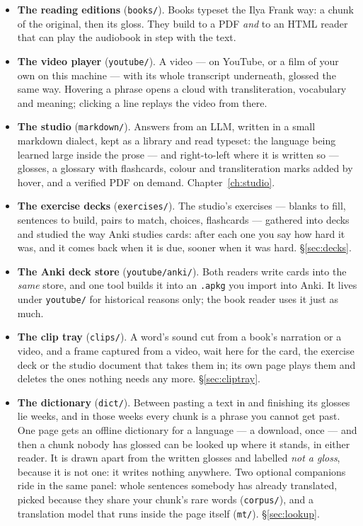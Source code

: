 \documentclass[11pt,oneside]{report}
\newcommand{\file}[1]{\texttt{#1}}
\begin{document}
\begin{itemize}
\item \textbf{The reading editions} (\file{books/}). Books typeset the
  Ilya Frank way: a chunk of the original, then its gloss. They build to a
  PDF \emph{and} to an HTML reader that can play the audiobook in step with
  the text.
\item \textbf{The video player} (\file{youtube/}). A video --- on YouTube,
  or a film of your own on this machine --- with its
  whole transcript underneath, glossed the same way. Hovering a phrase opens
  a cloud with transliteration, vocabulary and meaning; clicking a line
  replays the video from there.
\item \textbf{The studio} (\file{markdown/}). Answers from
  an LLM, written in a small markdown dialect, kept as a library and read
  typeset: the language being learned large inside the prose --- and
  right-to-left where it is written so --- glosses, a glossary with
  flashcards, colour and transliteration marks added by hover, and a
  verified PDF on demand. Chapter~\ref{ch:studio}.
\item \textbf{The exercise decks} (\file{exercises/}). The studio's
  exercises --- blanks to fill, sentences to build, pairs to match, choices,
  flashcards --- gathered into decks and studied the way Anki studies cards:
  after each one you say how hard it was, and it comes back when it is due,
  sooner when it was hard. \S\ref{sec:decks}.
\item \textbf{The Anki deck store} (\file{youtube/anki/}). Both readers
  write cards into the \emph{same} store, and one tool builds it into an
  \file{.apkg} you import into Anki. It lives under \file{youtube/} for
  historical reasons only; the book reader uses it just as much.
\item \textbf{The clip tray} (\file{clips/}). A word's sound cut from a
  book's narration or a video, and a frame captured from a video, wait here
  for the card, the exercise deck or the studio document that takes them in;
  its own page plays them and deletes the ones nothing needs any more.
  \S\ref{sec:cliptray}.
\item \textbf{The dictionary} (\file{dict/}). Between pasting a text in and
  finishing its glosses lie weeks, and in those weeks every chunk is a phrase
  you cannot get past. One page gets an offline dictionary for a language ---
  a download, once --- and then a chunk nobody has glossed can be looked up
  where it stands, in either reader. It is drawn apart from the written
  glosses and labelled \emph{not a gloss}, because it is not one: it writes
  nothing anywhere. Two optional companions ride in the same panel: whole
  sentences somebody has already translated, picked because they share your
  chunk's rare words (\file{corpus/}), and a translation model that runs
  inside the page itself (\file{mt/}). \S\ref{sec:lookup}.
\end{itemize}
\end{document}
